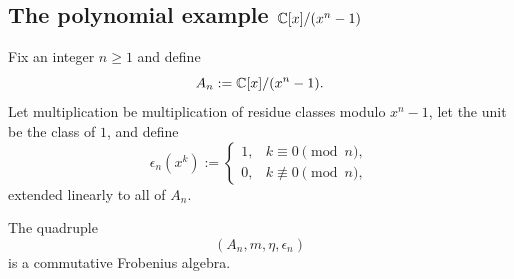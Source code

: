 \subsection{The polynomial example \texorpdfstring{$\mathbb{C}[x]/(x^n-1)$}{C[x]/(x^n-1)}}

\begin{example}\label{ex:cyclic-frobenius}
Fix an integer $n \geq 1$ and define
\begin{equation}\label{eq:An-definition}
A_n := \mathbb{C}[x]/(x^n-1).
\end{equation}
Let multiplication be multiplication of residue classes modulo $x^n-1$, let the unit be the class of $1$, and define
\begin{equation}\label{eq:An-trace}
\epsilon_n(x^k) :=
\begin{cases}
1, & k \equiv 0 \pmod n,\\
0, & k \not\equiv 0 \pmod n,
\end{cases}
\end{equation}
extended linearly to all of $A_n$.
\end{example}

\begin{proposition}\label{prop:An-frobenius}
The quadruple
\begin{equation}\label{eq:An-quadruple}
(A_n,m,\eta,\epsilon_n)
\end{equation}
is a commutative Frobenius algebra.
\end{proposition}


